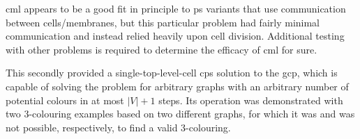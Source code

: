 \Gls{cml} appears to be a good fit in principle to \gls{ps} variants that use communication between cells/membranes, but this particular problem had fairly minimal communication and instead relied heavily upon cell division.  Additional testing with other problems is required to determine the efficacy of \gls{cml} for sure.

This  secondly provided a single-top-level-cell \gls{cps} solution to the \gls{gcp}, which is capable of solving the problem for arbitrary graphs with an arbitrary number of potential colours in at most \(|V| + 1\) steps.  Its operation was demonstrated with two 3-colouring examples based on two different graphs, for which it was and was not possible, respectively, to find a valid 3-colouring.
